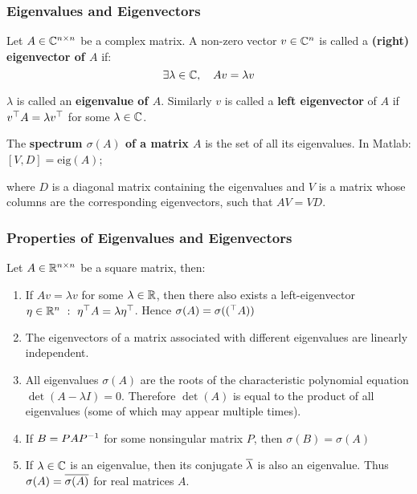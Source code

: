 \subsubsection{Eigenvalues and Eigenvectors}
\label{ssub:eigenvalues_and_eigenvectors}

Let $A \in \mathbb{C}^{n \times n}$ be a complex matrix.
A non-zero vector $v \in \mathbb{C}^n$ is called a \textbf{(right) eigenvector of $A$} if:
	\[\exists \lambda \in \mathbb{C}, \quad Av = \lambda v\]

\noindent
$\lambda$ is called an \textbf{eigenvalue of $A$}.
Similarly $v$ is called a \textbf{left eigenvector} of $A$ if
$v^{\top}A = \lambda v^{\top}$ for some $\lambda \in \mathbb{C}$.

\noindent
The \textbf{spectrum $\sigma(A)$ of a matrix $A$} is the set of all its eigenvalues.
In Matlab: $[V,D] = \text{eig} (A)$;

\noindent
where $D$ is a diagonal matrix containing the eigenvalues and
$V$ is a matrix whose columns are the corresponding eigenvectors,
such that $AV = VD$.


\subsubsection{Properties of Eigenvalues and Eigenvectors}
\label{ssub:properties_of_eigenvalues_and_eigenvectors}

Let $A \in \mathbb{R}^{n \times n}$ be a square matrix, then:
\begin{enumerate}
	\item If $Av = \lambda v$ for some $\lambda \in \mathbb{R}$, then there also exists a
		left-eigenvector $\eta \in \Rn \ : \ \tr{\eta}A = \lambda \tr{\eta}$.
		Hence $\sigma(A) = \sigma((^{\top}A))$
	\item The eigenvectors of a matrix associated with different
		eigenvalues are linearly independent.
	\item All eigenvalues $\sigma(A)$ are the roots of the characteristic
		polynomial equation $\det(A - \lambda I) = 0$.
		Therefore $\det(A)$ is equal to the product of all eigenvalues
		(some of which may appear multiple times).
	\item If $B = PAP^{-1}$ for some nonsingular matrix $P$,
		then $\sigma(B) = \sigma(A)$
	\item If $\lambda \in \mathbb{C}$ is an eigenvalue, then its conjugate
		$\overline{\lambda}$ is also an eigenvalue.
		Thus $\sigma(A) = \overline{\sigma(A)}$ for real matrices $A$.
\end{enumerate}


